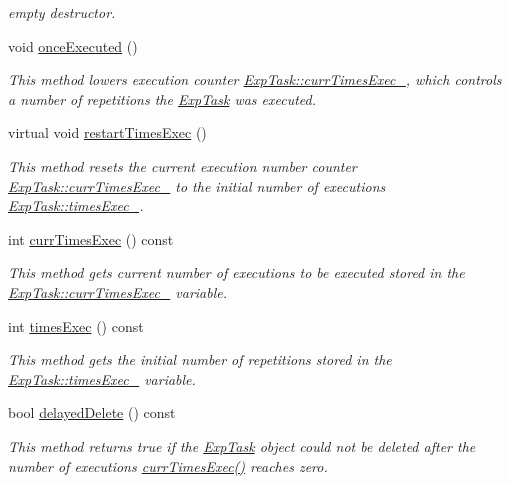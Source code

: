 \begin{DoxyCompactItemize}
\begin{DoxyCompactList}\small\item\em empty destructor. \end{DoxyCompactList}\item 
void \hyperlink{class_exp_task_a4b1e37a956ea18764bb62b8b9ffa52d3}{once\+Executed} ()
\begin{DoxyCompactList}\small\item\em This method lowers execution counter \hyperlink{class_exp_task_a56421ba6834b53d845c1c6d14ede077f}{Exp\+Task\+::curr\+Times\+Exec\+\_\+}, which controls a number of repetitions the \hyperlink{class_exp_task}{Exp\+Task} was executed. \end{DoxyCompactList}\item 
virtual void \hyperlink{class_exp_task_ac84290f4ee014237657794522350cfea}{restart\+Times\+Exec} ()
\begin{DoxyCompactList}\small\item\em This method resets the current execution number counter \hyperlink{class_exp_task_a56421ba6834b53d845c1c6d14ede077f}{Exp\+Task\+::curr\+Times\+Exec\+\_\+} to the initial number of executions \hyperlink{class_exp_task_af38ca6f3252632f98e496758349477ac}{Exp\+Task\+::times\+Exec\+\_\+}. \end{DoxyCompactList}\item 
int \hyperlink{class_exp_task_a1ab988b6d9eb6d61cd1b3ac1a1c42153}{curr\+Times\+Exec} () const 
\begin{DoxyCompactList}\small\item\em This method gets current number of executions to be executed stored in the \hyperlink{class_exp_task_a56421ba6834b53d845c1c6d14ede077f}{Exp\+Task\+::curr\+Times\+Exec\+\_\+} variable. \end{DoxyCompactList}\item 
int \hyperlink{class_exp_task_acdb19df2cfecd5c7f7d28141b062a6fe}{times\+Exec} () const 
\begin{DoxyCompactList}\small\item\em This method gets the initial number of repetitions stored in the \hyperlink{class_exp_task_af38ca6f3252632f98e496758349477ac}{Exp\+Task\+::times\+Exec\+\_\+} variable. \end{DoxyCompactList}\item 
bool \hyperlink{class_exp_task_a440f37ee2170c077082f3d29f229be1b}{delayed\+Delete} () const 
\begin{DoxyCompactList}\small\item\em This method returns true if the \hyperlink{class_exp_task}{Exp\+Task} object could not be deleted after the number of executions \hyperlink{class_exp_task_a1ab988b6d9eb6d61cd1b3ac1a1c42153}{curr\+Times\+Exec()} reaches zero. \end{DoxyCompactList}\item 

\end{DoxyCompactItemize}
